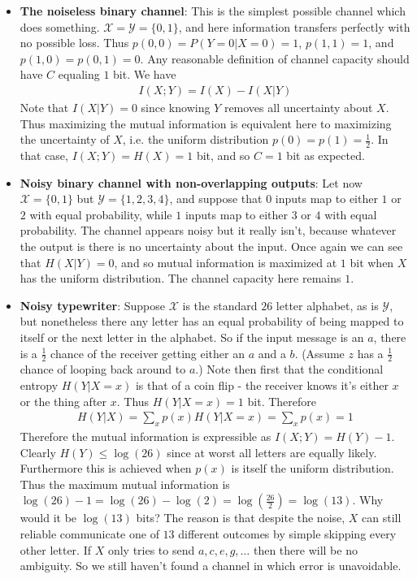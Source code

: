 \documentclass{article}
\theoremstyle{definition}
\theoremstyle{plain}
\begin{document}
\begin{itemize}
	\item \textbf{The noiseless binary channel}: This is the simplest possible channel which does something. $\mathcal{X} = \mathcal{Y} = \{0,1\}$, and here information transfers perfectly with no possible loss. Thus $p(0,0) = P(Y = 0|X=0) = 1$, $p(1,1) = 1$, and $p(1,0) = p(0,1) = 0$. Any reasonable definition of channel capacity should have $C$ equaling $1$ bit. We have
	\begin{align}
		I(X;Y) = I(X) - I(X|Y)
	\end{align}
	Note that $I(X|Y) = 0$ since knowing $Y$ removes all uncertainty about $X$. Thus maximizing the mutual information is equivalent here to maximizing the uncertainty of $X$, i.e. the uniform distribution $p(0) = p(1) = \frac{1}{2}$. In that case, $I(X;Y) = H(X) = 1$ bit, and so $C = 1$ bit as expected. 
	\item \textbf{Noisy binary channel with non-overlapping outputs}: Let now $\mathcal{X} = \{0,1\}$ but $\mathcal{Y} = \{1,2,3,4\}$, and suppose that $0$ inputs map to either $1$ or $2$ with equal probability, while $1$ inputs map to either $3$ or $4$ with equal probability. The channel appears noisy but it really isn't, because whatever the output is there is no uncertainty about the input. Once again we can see that $H(X|Y) = 0$, and so mutual information is maximized at $1$ bit when $X$ has the uniform distribution. The channel capacity here remains $1$. 
	\item \textbf{Noisy typewriter}: Suppose $\mathcal{X}$ is the standard $26$ letter alphabet, as is $\mathcal{Y}$, but nonetheless there any letter has an equal probability of being mapped to itself or the next letter in the alphabet. So if the input message is an $a$, there is a $\frac{1}{2}$ chance of the receiver getting either an $a$ and a $b$. (Assume $z$ has a $\frac{1}{2}$ chance of looping back around to $a$.) Note then first that the conditional entropy $H(Y|X=x)$ is that of a coin flip - the receiver knows it's either $x$ or the thing after $x$. Thus $H(Y|X=x) = 1$ bit. Therefore 
	\begin{align}
		H(Y|X) = \sum_x p(x)H(Y|X=x) = \sum_x p(x) = 1
	\end{align}
Therefore the mutual information is expressible as $I(X;Y) = H(Y) - 1$. Clearly $H(Y) \leq \log(26)$ since at worst all letters are equally likely. Furthermore this is achieved when $p(x)$ is itself the uniform distribution. Thus the maximum mutual information is $\log(26)-1 = \log(26) - \log(2) = \log(\frac{26}{2}) = \log(13)$.  Why would it be $\log(13)$ bits? The reason is that despite the noise, $X$ can still reliable communicate one of $13$ different outcomes by simple skipping every other letter. If $X$ only tries to send $a,c,e,g,\ldots$ then there will be no ambiguity. So we still haven't found a channel in which error is unavoidable. 

\end{itemize}
\end{document}
